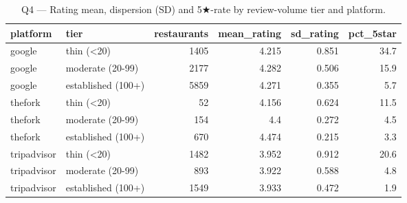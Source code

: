 \begin{table}[ht]
\centering
\caption{Q4 — Rating mean, dispersion (SD) and 5★-rate by review-volume tier and platform.}
\label{tab:q4_volatility_by_tier}
{\tiny
\begin{tabular}{llrrrr}
\toprule
platform & tier & restaurants & mean\_rating & sd\_rating & pct\_5star \\
\midrule
google & thin (<20) & 1405 & 4.215 & 0.851 & 34.7 \\
google & moderate (20-99) & 2177 & 4.282 & 0.506 & 15.9 \\
google & established (100+) & 5859 & 4.271 & 0.355 & 5.7 \\
thefork & thin (<20) & 52 & 4.156 & 0.624 & 11.5 \\
thefork & moderate (20-99) & 154 & 4.4 & 0.272 & 4.5 \\
thefork & established (100+) & 670 & 4.474 & 0.215 & 3.3 \\
tripadvisor & thin (<20) & 1482 & 3.952 & 0.912 & 20.6 \\
tripadvisor & moderate (20-99) & 893 & 3.922 & 0.588 & 4.8 \\
tripadvisor & established (100+) & 1549 & 3.933 & 0.472 & 1.9 \\
\bottomrule
\end{tabular}
}
\end{table}
